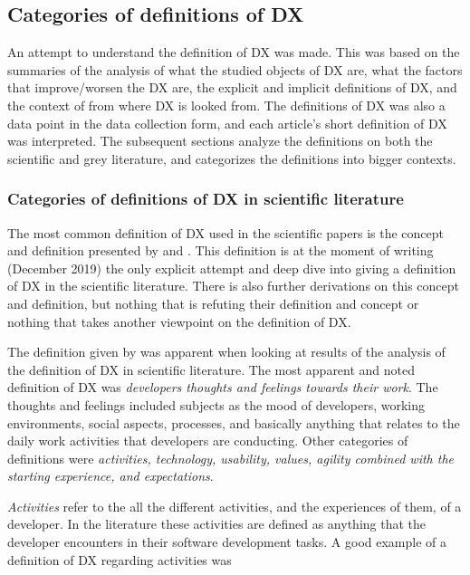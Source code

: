 \documentclass[english, 12pt, a4paper, sci, utf8, a-1b, online]{aaltothesis}
\newcommand{\now}{December 2019}
\begin{document}
\subsection{Categories of definitions of DX}

An attempt to understand the definition of DX was made. This was based on the summaries of the analysis of what the studied objects of DX are, what the factors that improve/worsen the DX are, the explicit and implicit definitions of DX, and the context of from where DX is looked from. The definitions of DX was also a data point in the data collection form, and each article's short definition of DX was interpreted. The subsequent sections analyze the definitions on both the scientific and grey literature, and categorizes the definitions into bigger contexts.

\subsubsection{Categories of definitions of DX in scientific literature}

The most common definition of DX used in the scientific papers is the concept and definition presented by \textcite{fagerholm-dx-concept-and-definition} and \textcite{fagerholm-doctoral-thesis}. This definition is at the moment of writing (\now) the only explicit attempt and deep dive into giving a definition of DX in the scientific literature. There is also further derivations on this concept and definition, but nothing that is refuting their definition and concept or nothing that takes another viewpoint on the definition of DX.

The definition given by \textcite{fagerholm-dx-concept-and-definition} was apparent when looking at results of the analysis of the definition of DX in scientific literature. The most apparent and noted definition of DX was \textit{developers thoughts and feelings towards their work}. The thoughts and feelings included subjects as the mood of developers, working environments, social aspects, processes, and basically anything that relates to the daily work activities that developers are conducting. Other categories of definitions were \textit{activities, technology, usability, values, agility combined with the starting experience, and expectations}.

\textit{Activities} refer to the all the different activities, and the experiences of them, of a developer. In the literature these activities are defined as anything that the developer encounters in their software development tasks. A good example of a definition of DX regarding activities was
\end{document}
